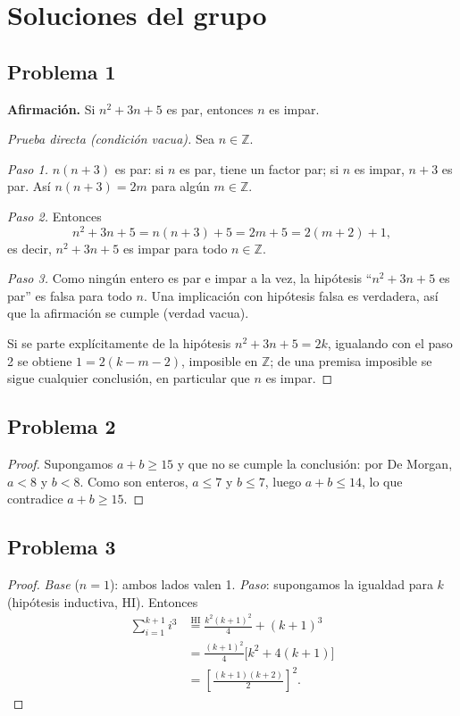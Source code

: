 \documentclass[conference]{IEEEtran}
\newcommand{\Z}{\mathbb{Z}}
\begin{document}
\section{Soluciones del grupo}\label{sec:sol}

\subsection{Problema 1}
\textbf{Afirmación.} Si $n^2+3n+5$ es par, entonces $n$ es impar.

\begin{proof}[Prueba directa (condición vacua)]
Sea $n\in\Z$.

\emph{Paso 1.} $n(n+3)$ es par: si $n$ es par, tiene un factor par; si $n$ es impar, $n+3$ es par. Así $n(n+3)=2m$ para algún $m\in\Z$.

\emph{Paso 2.} Entonces
\[
n^2+3n+5=n(n+3)+5=2m+5=2(m+2)+1,
\]
es decir, $n^2+3n+5$ es impar para todo $n\in\Z$.

\emph{Paso 3.} Como ningún entero es par e impar a la vez, la hipótesis ``$n^2+3n+5$ es par'' es falsa para todo $n$. Una implicación con hipótesis falsa es verdadera, así que la afirmación se cumple (verdad vacua).

Si se parte explícitamente de la hipótesis $n^2+3n+5=2k$, igualando con el paso 2 se obtiene $1=2(k-m-2)$, imposible en $\Z$; de una premisa imposible se sigue cualquier conclusión, en particular que $n$ es impar.
\end{proof}

\subsection{Problema 2}
\begin{proof}
Supongamos $a+b\ge15$ y que no se cumple la conclusión: por De Morgan, $a<8$ y $b<8$. Como son enteros, $a\le7$ y $b\le7$, luego $a+b\le14$, lo que contradice $a+b\ge15$.
\end{proof}

\subsection{Problema 3}
\begin{proof}
\emph{Base} ($n=1$): ambos lados valen 1. \emph{Paso}: supongamos la igualdad para $k$ (hipótesis inductiva, HI). Entonces
\begin{align*}
\sum_{i=1}^{k+1}i^3 &\overset{\text{HI}}{=} \frac{k^2(k+1)^2}{4}+(k+1)^3\\
&=\frac{(k+1)^2}{4}\bigl[k^2+4(k+1)\bigr]\\
&=\left[\frac{(k+1)(k+2)}{2}\right]^2.
\end{align*}
\end{proof}
\end{document}

